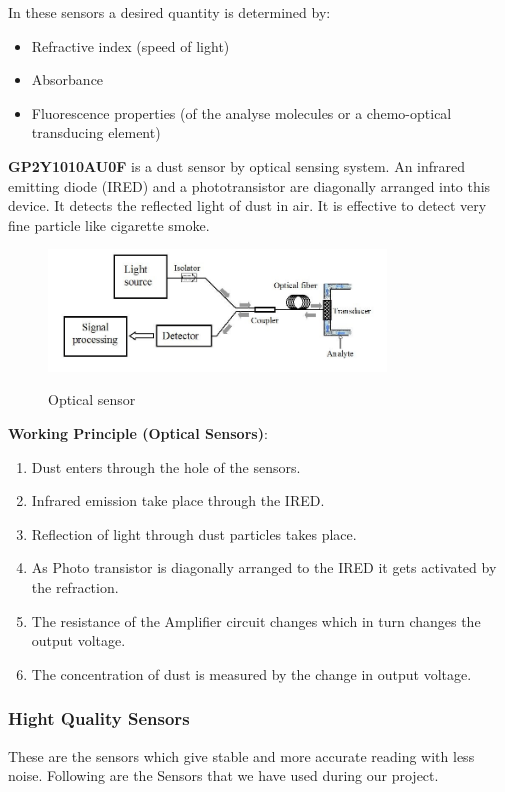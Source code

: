 \begin{enumerate}
	In these sensors a desired quantity is determined by:
	\begin{itemize}
		\item Refractive index (speed of light)
		\item Absorbance
		\item Fluorescence properties (of the analyse molecules or a chemo-optical transducing element)
	\end{itemize}

	\textbf{GP2Y1010AU0F} is a dust sensor by optical sensing system. An infrared emitting diode (IRED) and a phototransistor are diagonally arranged into this device. It detects the reflected light of dust in air. It is effective to detect very fine particle like cigarette smoke.
\begin{figure}
\centering
\includegraphics[width=0.8\textwidth]{./optical}\\[0.1in]
\label{fig: Optical sensor}
\caption{Optical sensor}
\end{figure}

	\textbf{Working Principle (Optical Sensors)}:
	\begin{enumerate}
		\item Dust enters through the hole of the sensors.
		\item Infrared emission take place through the IRED.
		\item Reflection of light through dust particles takes place.
		\item As Photo transistor is diagonally arranged to the IRED it gets activated by the refraction. 
		\item The resistance of the Amplifier circuit changes which in turn changes the output voltage.
		\item The concentration of dust is measured by the change in output voltage. 
	\end{enumerate}

\end{enumerate}

\subsubsection{Hight Quality Sensors}
These are the sensors which give stable and more accurate reading with less noise. Following are the Sensors that we have used during our project.

